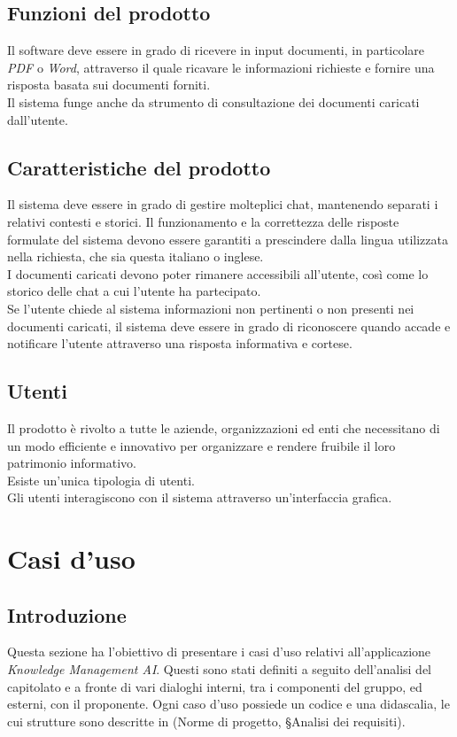 \documentclass[10pt, a4paper]{article}
\begin{document}
\subsection{Funzioni del prodotto}
Il software deve essere in grado di ricevere in input documenti, in particolare \textit{PDF} o \textit{Word}, attraverso il quale ricavare le informazioni richieste e fornire una risposta basata sui documenti forniti.\\
Il sistema funge anche da strumento di consultazione dei documenti caricati dall'utente.
\subsection{Caratteristiche del prodotto}
Il sistema deve essere in grado di gestire molteplici chat, mantenendo separati i relativi contesti e storici. 
Il funzionamento e la correttezza delle risposte formulate del sistema devono essere garantiti a prescindere dalla lingua utilizzata nella richiesta, che sia questa italiano o inglese.\\
I documenti caricati devono poter rimanere accessibili all'utente, così come lo storico delle chat a cui l'utente ha partecipato.\\
Se l'utente chiede al sistema informazioni non pertinenti o non presenti nei documenti caricati, il sistema deve essere in grado di riconoscere quando accade e notificare l'utente attraverso una risposta informativa e cortese.
\subsection{Utenti}
Il prodotto è rivolto a tutte le aziende, organizzazioni ed enti che necessitano di un modo efficiente e innovativo per organizzare e rendere fruibile il loro patrimonio informativo.\\
Esiste un'unica tipologia di utenti.\\
Gli utenti interagiscono con il sistema attraverso un'interfaccia grafica.
\newpage

\section{Casi d'uso}

\subsection{Introduzione}
Questa sezione ha l'obiettivo di presentare i casi d'uso relativi all'applicazione \textit{Knowledge Management AI}. Questi sono stati definiti a seguito dell'analisi del capitolato e a fronte di vari dialoghi interni, tra i componenti del gruppo, ed esterni, con il proponente. Ogni caso d'uso possiede un codice e una didascalia, le cui strutture sono descritte in (Norme di progetto, \S Analisi dei requisiti).
\end{document}
